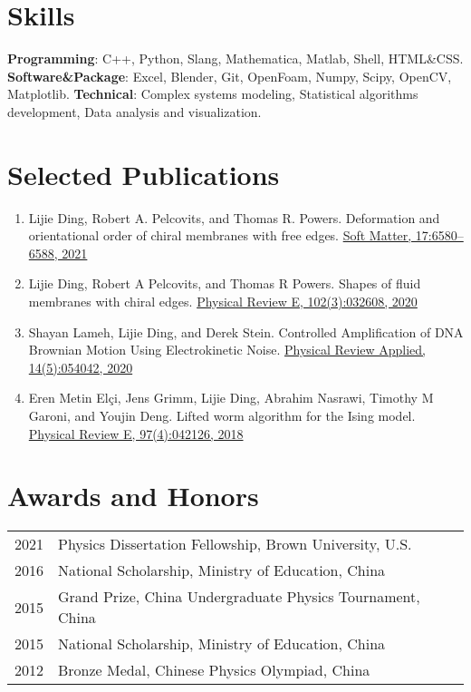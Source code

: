 \documentclass[11pt,letterpaper]{article}
\begin{document}
\section*{Skills}
\vspace*{-0.1in}
\textbf{Programming}: C++, Python, Slang, Mathematica, Matlab, Shell, HTML\&CSS. \newline
\textbf{Software\&Package}: Excel, Blender, Git, OpenFoam, Numpy, Scipy, OpenCV, Matplotlib. \newline
\textbf{Technical}: Complex systems modeling, Statistical algorithms development, Data analysis and visualization.

\section*{Selected Publications}
\vspace*{-0.1in}
\begin{enumerate}
    \item Lijie Ding, Robert A. Pelcovits, and Thomas R. Powers. Deformation and orientational order of chiral membranes with free edges. \href{https://pubs.rsc.org/en/content/articlehtml/2021/sm/d1sm00629k}{Soft Matter, 17:6580–6588, 2021}
    \item Lijie Ding, Robert A Pelcovits, and Thomas R Powers. Shapes of fluid membranes with chiral edges. \href{https://journals.aps.org/pre/abstract/10.1103/PhysRevE.102.032608}{Physical Review E, 102(3):032608, 2020}
    \item Shayan Lameh, Lijie Ding, and Derek Stein. Controlled Amplification of DNA Brownian Motion Using Electrokinetic Noise. \href{https://journals.aps.org/prapplied/abstract/10.1103/PhysRevApplied.14.054042}{Physical Review Applied, 14(5):054042, 2020}
    \item Eren Metin Elçi, Jens Grimm, Lijie Ding, Abrahim Nasrawi, Timothy M Garoni, and Youjin Deng. Lifted worm algorithm for the Ising model. \href{https://journals.aps.org/pre/abstract/10.1103/PhysRevE.97.042126}{Physical Review E, 97(4):042126, 2018}
\end{enumerate}

\section*{Awards and Honors}
\vspace*{-0.15in}
\begin{longtable}{l p{\linewidth}}
    2021 & Physics Dissertation Fellowship, Brown University, U.S.    \\
    2016 & National Scholarship, Ministry of Education, China         \\
    2015 & Grand Prize, China Undergraduate Physics Tournament, China \\
    2015 & National Scholarship, Ministry of Education, China         \\
    2012 & Bronze Medal, Chinese Physics Olympiad, China
\end{longtable}

\end{document}
